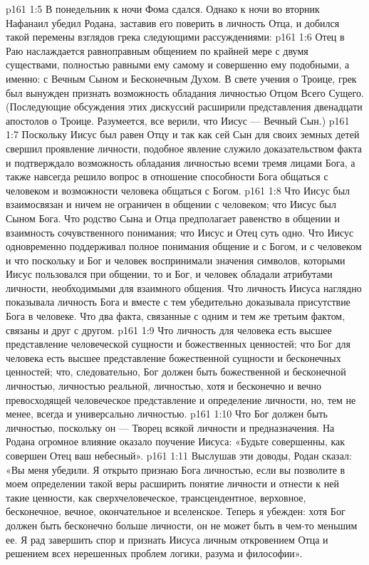 \vs p161 1:5 В понедельник к ночи Фома сдался. Однако к ночи во вторник Нафанаил убедил Родана, заставив его поверить в личность Отца, и добился такой перемены взглядов грека следующими рассуждениями:
\vs p161 1:6 \bibnobreakspace Отец в Раю наслаждается равноправным общением по крайней мере с двумя существами, полностью равными ему самому и совершенно ему подобными, а именно: с Вечным Сыном и Бесконечным Духом. В свете учения о Троице, грек был вынужден признать возможность обладания личностью Отцом Всего Сущего. (Последующие обсуждения этих дискуссий расширили представления двенадцати апостолов о Троице. Разумеется, все верили, что Иисус --- Вечный Сын.)
\vs p161 1:7 \pc {}\bibnobreakspace Поскольку Иисус был равен Отцу и так как сей Сын для своих земных детей свершил проявление личности, подобное явление служило доказательством факта и подтверждало возможность обладания личностью всеми тремя лицами Бога, а также навсегда решило вопрос в отношение способности Бога общаться с человеком и возможности человека общаться с Богом.
\vs p161 1:8 \pc {}\bibnobreakspace Что Иисус был взаимосвязан и ничем не ограничен в общении с человеком; что Иисус был Сыном Бога. Что родство Сына и Отца предполагает равенство в общении и взаимность сочувственного понимания; что Иисус и Отец суть одно. Что Иисус одновременно поддерживал полное понимания общение и с Богом, и с человеком и что поскольку и Бог и человек воспринимали значения символов, которыми Иисус пользовался при общении, то и Бог, и человек обладали атрибутами личности, необходимыми для взаимного общения. Что личность Иисуса наглядно показывала личность Бога и вместе с тем убедительно доказывала присутствие Бога в человеке. Что два факта, связанные с одним и тем же третьим фактом, связаны и друг с другом.
\vs p161 1:9 \pc {}\bibnobreakspace Что личность для человека есть высшее представление человеческой сущности и божественных ценностей; что Бог для человека есть высшее представление божественной сущности и бесконечных ценностей; что, следовательно, Бог должен быть божественной и бесконечной личностью, личностью реальной, личностью, хотя и бесконечно и вечно превосходящей человеческое представление и определение личности, но, тем не менее, всегда и универсально личностью.
\vs p161 1:10 \pc {}\bibnobreakspace Что Бог должен быть личностью, поскольку он --- Творец всякой личности и предназначения. На Родана огромное влияние оказало поучение Иисуса: «Будьте совершенны, как совершен Отец ваш небесный».
\vs p161 1:11 \pc Выслушав эти доводы, Родан сказал: «Вы меня убедили. Я открыто признаю Бога личностью, если вы позволите в моем определении такой веры расширить понятие личности и отнести к ней такие ценности, как сверхчеловеческое, трансцендентное, верховное, бесконечное, вечное, окончательное и вселенское. Теперь я убежден: хотя Бог должен быть бесконечно больше личности, он не может быть в чем\hyp{}то меньшим ее. Я рад завершить спор и признать Иисуса личным откровением Отца и решением всех нерешенных проблем логики, разума и философии».
